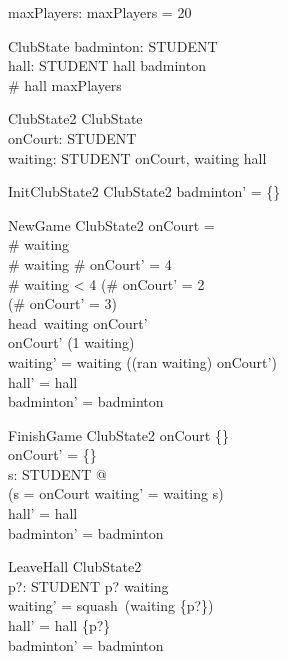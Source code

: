 \documentclass{article}
\begin{document}
\begin{zed}
[STUDENT]
\end{zed}


\begin{axdef}
maxPlayers: \nat
\where
maxPlayers = 20
\end{axdef}

\begin{schema}{ClubState}
badminton: \power STUDENT\\
hall: \power STUDENT
\where
hall \subseteq badminton\\
\# hall \leq maxPlayers
\end{schema}

\begin{schema}{ClubState2}
ClubState\\
onCourt: \power STUDENT\\
waiting: \iseq STUDENT
\where
\langle onCourt, \ran waiting \rangle \partition hall
\end{schema}

\begin{schema}{InitClubState2}
ClubState2
\where
badminton' = \{\}
\end{schema}

\begin{schema}{NewGame}
\Delta ClubState2
\where
onCourt = \emptyset\\
\# waiting \\
\# waiting  \implies \# onCourt' = 4\\
\# waiting < 4 \implies (\# onCourt' = 2\\
\lor (\# onCourt' = 3)\\
head~waiting \in onCourt'\\
onCourt' \subseteq \ran (1 \lhd waiting)\\
waiting' = waiting \project ((ran waiting) \setminus onCourt')\\
hall' = hall\\
badminton' = badminton
\end{schema}

\begin{schema}{FinishGame}
\Delta ClubState2
\where
onCourt \neq \{\}\\
onCourt' = \{\}\\
\exists s: \iseq STUDENT @ \\
(\ran s = onCourt \land waiting' = waiting \cat s)\\
hall' = hall\\
badminton' = badminton
\end{schema}

\begin{schema}{LeaveHall}
\Delta ClubState2\\
p?: STUDENT
\where
p? \in \ran waiting \\
waiting' = squash~(waiting \nrres\{p?\})\\
hall' = hall \setminus \{p?\}\\
badminton' = badminton
\end{schema}
\end{document}
